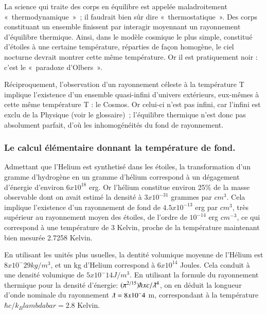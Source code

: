 \documentclass[a4paper,12pt]{article}
\begin{document}
      La science qui traite des corps en équilibre est appelée maladroitement « thermodynamique » ; il faudrait bien sûr dire « thermostatique ». Des corps constituant un ensemble finissent par interagir moyennant un rayonnement d'équilibre thermique. 
Ainsi, dans le modèle cosmique le plus simple, constitué d'étoiles à une certaine température, réparties de façon homogène, le ciel nocturne devrait montrer cette même température. Or il est pratiquement noir : c'est le « paradoxe d'Olbers ».



Réciproquement, l'observation d'un rayonnement céleste à la température T implique l'existence d'un ensemble quasi-infini d'univers extérieurs, eux-mêmes à cette même température T : le Cosmos. Or celui-ci n'est pas infini, car l'infini est exclu de la Physique (voir le glossaire) ; l'équilibre thermique n'est donc pas absolument parfait, d'où les inhomogénéités du fond de rayonnement.








\subsubsection{Le calcul élémentaire donnant la température de fond.}

Admettant que l'Helium est synthetisé dans les étoiles, la transformation d'un gramme d'hydrogène en un gramme d'hélium correspond à un dégagement d'énergie d'environ $6 x 10^{18}$ erg. Or l'hélium  constitue environ 25\% de la masse observable dont on avait estimé la densité à $3 x 10^{-31}$ grammes par $cm^3$. Cela implique l'existence d'un rayonnement de fond de $4.5 x 10^{-13}$ erg par $cm^3$,  très supérieur au rayonnement moyen des étoiles, de l'ordre de $10^{-14}$ erg $cm^{-3}$, ce qui correspond à une température de 3 Kelvin, proche de la température maintenant bien mesurée  2.7258   Kelvin.

En utilisant les unités plus usuelles, la dentité volumique moyenne de l'Hélium est $8 x 10^-29 kg/m^3$, et un kg d'Helium correspond à $6 x 10^{14}$ Joules. Cela conduit à une densité volumique de $5x 10^-14 J/m^3$. En utilisant la formule du rayonnement thermique pour la densité d'énergie: $(\pi^{2/15}) \hbar x c/\lambdabar^4$, on en déduit la longueur d'onde nominale du rayonnement $\lambdabar = 8x 10^-4$ m, correspondant à la température $\hbar c/k_ B lambdabar = 2.8$ Kelvin.
\end{document}
